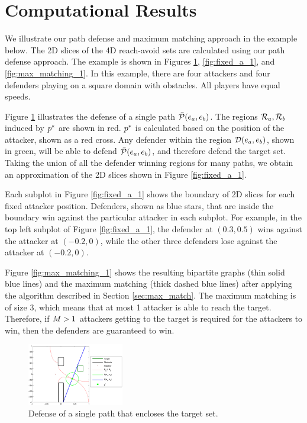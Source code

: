 \section{Computational Results}
\label{sec:results}
We illustrate our path defense and maximum matching approach in the example below. The 2D slices of the 4D reach-avoid sets are calculated using our path defense approach. The example is shown in Figures \ref{fig:pd_ex}, \ref{fig:fixed_a_1}, and \ref{fig:max_matching_1}. In this example, there are four attackers and four defenders playing on a square domain with obstacles. All players have equal speeds. 

Figure \ref{fig:pd_ex} illustrates the defense of a single path $\bar{\mathcal{P}}(e_a,e_b)$. The regions $\mathcal{R}_a,\mathcal{R}_b$ induced by $p^*$ are shown in red. $p^*$ is calculated based on the position of the attacker, shown as a red cross. Any defender within the region $\mathcal{D}(e_a,e_b)$, shown in green, will be able to defend $\bar{\mathcal{P}}(e_a,e_b)$, and therefore defend the target set. Taking the union of all the defender winning regions for many paths, we obtain an approximation of the 2D slices shown in Figure \ref{fig:fixed_a_1}.

Each subplot in Figure \ref{fig:fixed_a_1} shows the boundary of 2D slices for each fixed attacker position. Defenders, shown as blue stars, that are inside the boundary win against the particular attacker in each subplot. For example, in the top left subplot of Figure \ref{fig:fixed_a_1}, the defender at $(0.3, 0.5)$ wins against the attacker at $(-0.2, 0)$, while the other three defenders lose against the attacker at $(-0.2, 0)$.

Figure \ref{fig:max_matching_1} shows the resulting bipartite graphs (thin solid blue lines) and the maximum matching (thick dashed blue lines) after applying the algorithm described in Section \ref{sec:max_match}. The maximum matching is of size 3, which means that at most 1 attacker is able to reach the target. Therefore, if $M>1$ attackers getting to the target is required for the attackers to win, then the defenders are guaranteed to win. 


\begin{figure}[H]
	\centering
	\includegraphics[width=0.375\textwidth]{"fig/PD example"}
	\caption{Defense of a single path that encloses the target set.}
	\label{fig:pd_ex}
\end{figure}

